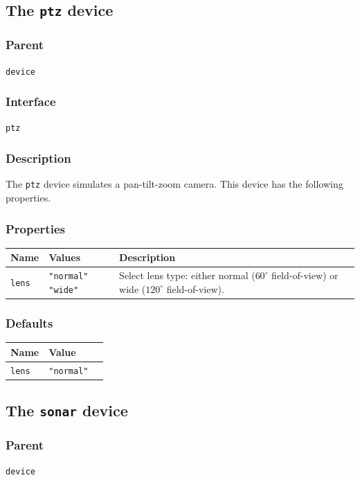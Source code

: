 \documentclass[11pt,twoside]{report}
\begin{document}
\newpage
\subsection{The {\tt ptz} device}

\subsubsection*{Parent}
{\tt device}

\subsubsection*{Interface}
{\tt ptz}

\subsubsection*{Description}
The {\tt ptz} device simulates a pan-tilt-zoom camera.
This device has the following properties.

\subsubsection*{Properties}
\begin{tabularx}{\columnwidth}{llX}
\hline
Name & Values & Description \\
\hline
\verb'lens' & \verb'"normal"' \verb'"wide"' & Select lens type: either
normal ($60^\circ$ field-of-view) or wide ($120^\circ$
field-of-view).\\
\hline
\end{tabularx}

\subsubsection*{Defaults}
\begin{tabularx}{\columnwidth}{llX}
\hline
Name & Value\\
\hline
\verb'lens' & \verb'"normal"'\\
\hline
\end{tabularx}

\newpage
\subsection{The {\tt sonar} device}

\subsubsection*{Parent}
{\tt device}
\end{document}
